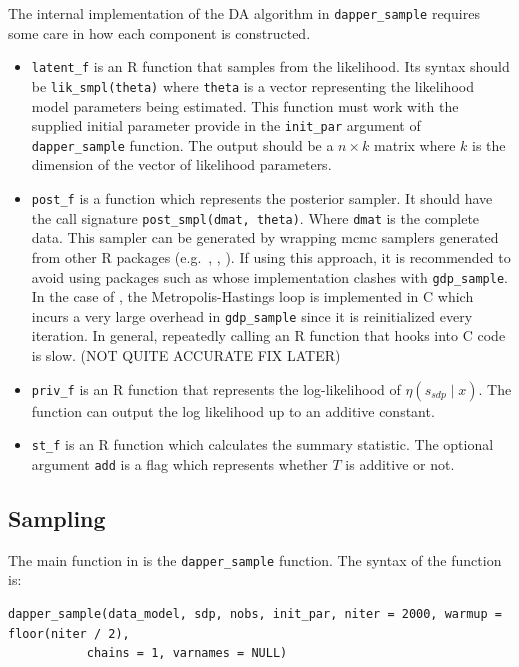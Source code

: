 The internal implementation of the DA algorithm in \texttt{dapper\_sample} requires
some care in how each component is constructed.

\begin{itemize}
\item
  \texttt{latent\_f} is an R function that samples from the likelihood. Its
  syntax should be \texttt{lik\_smpl(theta)} where \texttt{theta} is a vector
  representing the likelihood model parameters being estimated. This function
  must work with the supplied initial parameter provide in the \texttt{init\_par}
  argument of \texttt{dapper\_sample} function. The output should be a \(n \times k\) matrix
  where \(k\) is the dimension of the vector of likelihood parameters.
\item
  \texttt{post\_f} is a function which represents the posterior sampler. It should
  have the call signature \texttt{post\_smpl(dmat,\ theta)}. Where \texttt{dmat} is the
  complete data. This sampler can be generated by wrapping mcmc samplers generated from other R packages
  (e.g.~, , ).
  If using this approach, it is recommended to avoid using packages such as 
  whose implementation clashes with \texttt{gdp\_sample}. In the case of ,
  the Metropolis-Hastings loop is implemented in C which incurs a very large overhead
  in \texttt{gdp\_sample} since it is reinitialized every iteration. In general, repeatedly calling
  an R function that hooks into C code is slow. (NOT QUITE ACCURATE FIX LATER)
\item
  \texttt{priv\_f} is an R function that represents the log-likelihood of
  \(\eta(s_{sdp} \mid x)\). The function can output the log likelihood
  up to an additive constant.
\item
  \texttt{st\_f} is an R function which calculates the summary statistic. The optional
  argument \texttt{add} is a flag which represents whether \(T\) is additive or not.
\end{itemize}

\hypertarget{sampling}{%
\subsection{Sampling}\label{sampling}}

The main function in  is the \texttt{dapper\_sample} function. The syntax of the function is:

\begin{verbatim}
dapper_sample(data_model, sdp, nobs, init_par, niter = 2000, warmup = floor(niter / 2),
           chains = 1, varnames = NULL)
\end{verbatim}

